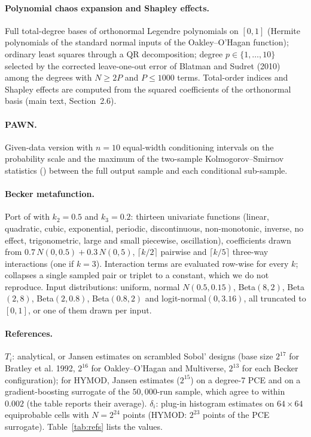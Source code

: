 \documentclass[11pt,a4paper]{article}
\begin{document}
\paragraph{Polynomial chaos expansion and Shapley effects.} Full total-degree bases of orthonormal Legendre polynomials on $[0,1]$ (Hermite polynomials of the standard normal inputs of the Oakley--O'Hagan function); ordinary least squares through a QR decomposition; degree $p\in\{1,\dots,10\}$ selected by the corrected leave-one-out error of Blatman and Sudret (2010) among the degrees with $N\ge2P$ and $P\le1000$ terms. Total-order indices and Shapley effects are computed from the squared coefficients of the orthonormal basis (main text, Section~2.6).

\paragraph{PAWN.} Given-data version with $n=10$ equal-width conditioning intervals on the probability scale and the maximum of the two-sample Kolmogorov--Smirnov statistics () between the full output sample and each conditional sub-sample.

\paragraph{Becker metafunction.} Port of  with $k_2=0.5$ and $k_3=0.2$: thirteen univariate functions (linear, quadratic, cubic, exponential, periodic, discontinuous, non-monotonic, inverse, no effect, trigonometric, large and small piecewise, oscillation), coefficients drawn from $0.7\,N(0,0.5)+0.3\,N(0,5)$, $\lceil k/2\rceil$ pairwise and $\lceil k/5\rceil$ three-way interactions (one if $k=3$). Interaction terms are evaluated row-wise for every $k$;  collapses a single sampled pair or triplet to a constant, which we do not reproduce. Input distributions: uniform, normal $N(0.5,0.15)$, Beta$(8,2)$, Beta$(2,8)$, Beta$(2,0.8)$, Beta$(0.8,2)$ and logit-normal$(0,3.16)$, all truncated to $[0,1]$, or one of them drawn per input.

\paragraph{References.} $T_i$: analytical, or Jansen estimates on scrambled Sobol' designs (base size $2^{17}$ for Bratley et al. 1992, $2^{16}$ for Oakley--O'Hagan and Multiverse, $2^{13}$ for each Becker configuration); for HYMOD, Jansen estimates ($2^{15}$) on a degree-7 PCE and on a gradient-boosting surrogate of the $50{,}000$-run sample, which agree to within $0.002$ (the table reports their average). $\delta_i$: plug-in histogram estimates on $64\times64$ equiprobable cells with $N=2^{24}$ points (HYMOD: $2^{23}$ points of the PCE surrogate). Table~\ref{tab:refs} lists the values.
\end{document}
